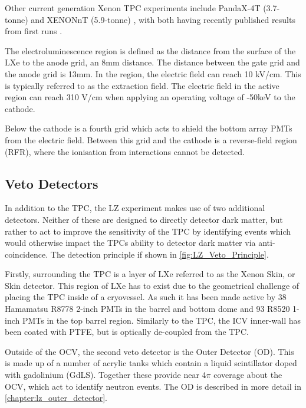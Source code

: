Other current generation Xenon TPC experiments include PandaX-4T (3.7-tonne) \cite{pandax_4t_ref} and XENONnT (5.9-tonne) \cite{xenonnt_projected_sensitivty_ref}, with both having recently published results from first runs \cite{pandax_4t_sr1_ref,xenonnt_sr1_er_ref}. 
\par
The electroluminescence region is defined as the distance from the surface of the LXe to the anode grid, an 8mm distance.
The distance between the gate grid and the anode grid is 13mm.
In the region, the electric field can reach 10 kV/cm.
This is typically referred to as the extraction field.
The electric field in the active region can reach 310 V/cm when applying an operating voltage of -50keV to the cathode.
\par
Below the cathode is a fourth grid which acts to shield the bottom array PMTs from the electric field.
Between this grid and the cathode is a reverse-field region (RFR), where the ionisation from interactions cannot be detected.


\subsection{Veto Detectors}
\label{sec:lz_veto_detectors}
\par
In addition to the TPC, the LZ experiment makes use of two additional detectors.
Neither of these are designed to directly detector dark matter, but rather to act to improve the sensitivity of the TPC by identifying events which would otherwise impact the TPCs ability to detector dark matter via anti-coincidence.
The detection principle if shown in \autoref{fig:LZ_Veto_Principle}.

\par
Firstly, surrounding the TPC is a layer of LXe referred to as the Xenon Skin, or Skin detector.
This region of LXe has to exist due to the geometrical challenge of placing the TPC inside of a cryovessel.
As such it has been made active by 38 Hamamatsu R8778 2-inch PMTs in the barrel and bottom dome and 93 R8520 1-inch PMTs in the top barrel region.
Similarly to the TPC, the ICV inner-wall has been coated with PTFE, but is optically de-coupled from the TPC.

\par
Outside of the OCV, the second veto detector is the Outer Detector (OD).
This is made up of a number of acrylic tanks which contain a liquid scintillator doped with gadolinium (GdLS).
Together these provide near 4$\pi$ coverage about the OCV, which act to identify neutron events.
The OD is described in more detail in \autoref{chapter:lz_outer_detector}.

